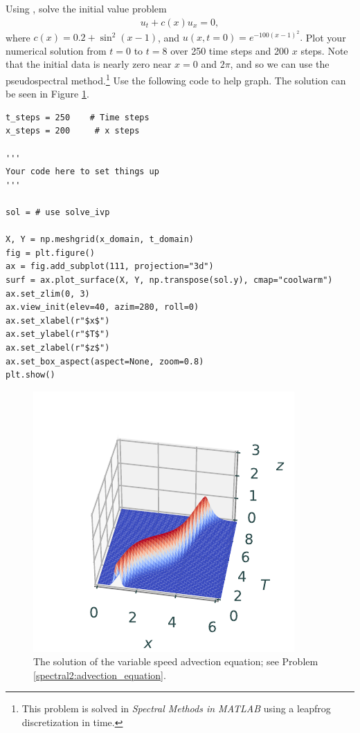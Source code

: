\begin{problem}
Using , solve the initial value problem
\begin{align}
	u_t +c(x) u_x = 0,
\end{align}
where $c(x) = 0.2 + \sin^2(x-1)$, and $u(x,t=0) = e^{-100(x-1)^2}.$
Plot your numerical solution from $t = 0$ to $t = 8$ over 250 time steps and 200 $x$ steps.
Note that the initial data is nearly zero near $x = 0$ and $2 \pi$, and so we can use the pseudospectral method.\footnote{This problem is solved in \textit{Spectral Methods in MATLAB} using a leapfrog discretization in time. }
\label{spectral2:advection_equation}
Use the following code to help graph. The solution can be seen in Figure \ref{fig:spectral:spectral2_advection}.
\begin{lstlisting}
t_steps = 250    # Time steps
x_steps = 200     # x steps

'''
Your code here to set things up
'''

sol = # use solve_ivp

X, Y = np.meshgrid(x_domain, t_domain)
fig = plt.figure()
ax = fig.add_subplot(111, projection="3d")
surf = ax.plot_surface(X, Y, np.transpose(sol.y), cmap="coolwarm")
ax.set_zlim(0, 3)
ax.view_init(elev=40, azim=280, roll=0)
ax.set_xlabel(r"$x$")
ax.set_ylabel(r"$T$")
ax.set_zlabel(r"$z$")
ax.set_box_aspect(aspect=None, zoom=0.8)
plt.show()
\end{lstlisting}
\end{problem}

\begin{figure}[H]
\centering
\includegraphics[width=\textwidth]{figures/variable_speed_advection.pdf}
\caption{The solution of the variable speed advection equation; see Problem \ref{spectral2:advection_equation}.}
\label{fig:spectral:spectral2_advection}
\end{figure}

